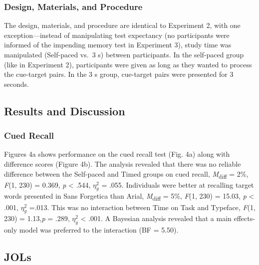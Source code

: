 \documentclass[
  english,
  jou]{apa7}
\begin{document}
\hypertarget{design-materials-and-procedure}{%
\subsubsection{Design, Materials, and Procedure}\label{design-materials-and-procedure}}

The design, materials, and procedure are identical to Experiment 2, with one exception---instead of manipulating test expectancy (no participants were informed of the impending memory test in Experiment 3), study time was manipulated (Self-paced vs.~3 s) between participants. In the self-paced group (like in Experiment 2), participants were given as long as they wanted to process the cue-target pairs. In the 3 s group, cue-target pairs were presented for 3 seconds.

\hypertarget{results-and-discussion-2}{%
\subsection{Results and Discussion}\label{results-and-discussion-2}}

\hypertarget{cued-recall-1}{%
\subsubsection{Cued Recall}\label{cued-recall-1}}

Figures 4a shows performance on the cued recall test (Fig. 4a) along with difference scores (Figure 4b). The analysis revealed that there was no reliable difference between the Self-paced and Timed groups on cued recall, \emph{M}\textsubscript{diff} = 2\%, \emph{F}(1, 230) = 0.369, \emph{p} \textless{} .544, \(\eta_{g}^{2}\) = .055. Individuals were better at recalling target words presented in Sans Forgetica than Arial, \emph{M}\textsubscript{diff} = 5\%, \emph{F}(1, 230) = 15.03, \emph{p} \textless{} .001, \(\eta_{g}^{2}\) =.013. This was no interaction between Time on Task and Typeface, \emph{F}(1, 230) = 1.13,\emph{p} = .289, \(\eta_{g}^{2}\) \textless{} .001. A Bayesian analysis revealed that a main effects-only model was preferred to the interaction (BF = 5.50).

\hypertarget{jols-2}{%
\subsection{JOLs}\label{jols-2}}
\end{document}
